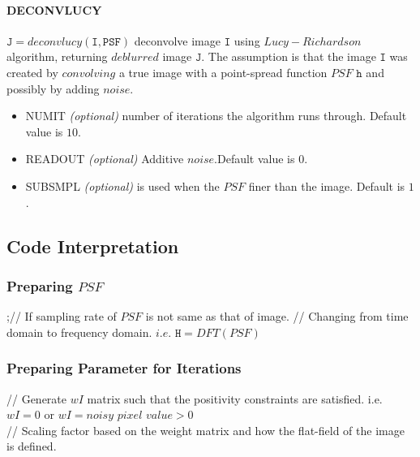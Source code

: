 \documentclass[a4paper]{book}
\begin{document}
\paragraph*{\normalsize DECONVLUCY}$\mathtt{J} = deconvlucy(\mathtt{I,PSF})$ deconvolve image $ \mathtt{I} $ using $ Lucy-Richardson $ algorithm, returning $ deblurred $ image $ \mathtt{J} $. The assumption is that the image $ \mathtt{I} $ was created by $ convolving $ a true image with a point-spread function $ PSF$ $\mathtt{h} $ and possibly by adding $ noise $.\\
\begin{itemize}
	\item NUMIT \textit{(optional)} number of iterations the algorithm runs through. Default value is $ 10 $.
	\item READOUT \textit{(optional)} Additive $ noise $.Default value is $ 0 $.
	\item SUBSMPL \textit{(optional)} is used when the $ PSF $ finer than the image. Default is $ 1 $.
\end{itemize}
%
%

\subsection{Code Interpretation}
\subsubsection{Preparing $ PSF $}
;// If sampling rate of $ PSF $ is not same as that of image.
// Changing from time domain to frequency domain. $ i.e.$ $ \mathtt{H} = DFT(PSF)$

\subsubsection{Preparing Parameter for Iterations}
// Generate $ wI $ matrix such that the positivity constraints are satisfied. i.e. $ wI = 0$ or $ wI = noisy$ $pixel$ $ value > 0 $\\
// Scaling factor based on the weight matrix and how the flat-field of the image is defined.
\end{document}
